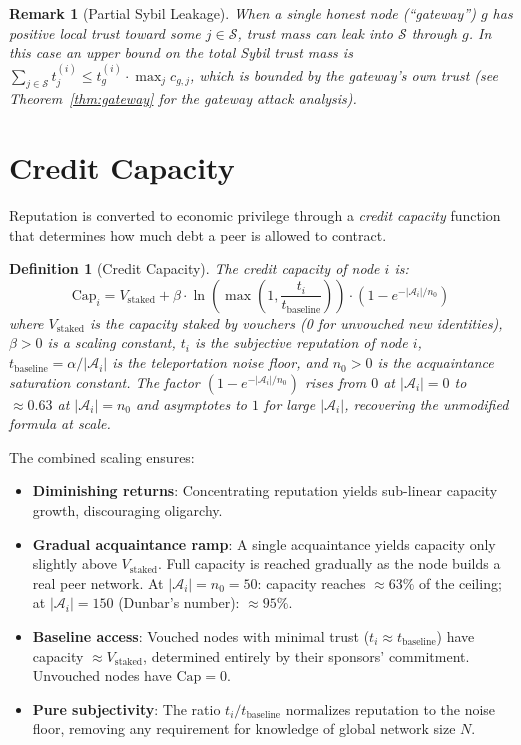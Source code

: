 \documentclass[11pt]{article}
\newtheorem{definition}[theorem]{Definition}
\newtheorem{remark}[theorem]{Remark}
\begin{document}
\begin{remark}[Partial Sybil Leakage]
When a single honest node (``gateway'') $g$ has positive local trust toward some $j \in \mathcal{S}$, trust mass can leak into $\mathcal{S}$ through $g$. In this case an upper bound on the total Sybil trust mass is $\sum_{j \in \mathcal{S}} t^{(i)}_j \leq t^{(i)}_g \cdot \max_j c_{g,j}$, which is bounded by the gateway's own trust (see Theorem~\ref{thm:gateway} for the gateway attack analysis).
\end{remark}

\section{Credit Capacity}
\label{sec:capacity}

Reputation is converted to economic privilege through a \emph{credit capacity} function that determines how much debt a peer is allowed to contract.

\begin{definition}[Credit Capacity]\label{def:capacity}
The credit capacity of node $i$ is:
\begin{equation}\label{eq:capacity}
    \text{Cap}_i = V_{\text{staked}} + \beta \cdot \ln\left(\max\left(1, \frac{t_i}{t_{\text{baseline}}}\right)\right) \cdot \left(1 - e^{-|\mathcal{A}_i| / n_0}\right)
\end{equation}
where $V_{\text{staked}}$ is the capacity staked by vouchers (0 for unvouched new identities), $\beta > 0$ is a scaling constant, $t_i$ is the subjective reputation of node $i$, $t_{\text{baseline}} = \alpha / |\mathcal{A}_i|$ is the \emph{teleportation noise floor}, and $n_0 > 0$ is the \emph{acquaintance saturation constant}. The factor $(1 - e^{-|\mathcal{A}_i|/n_0})$ rises from $0$ at $|\mathcal{A}_i|=0$ to $\approx 0.63$ at $|\mathcal{A}_i|=n_0$ and asymptotes to $1$ for large $|\mathcal{A}_i|$, recovering the unmodified formula at scale.
\end{definition}

The combined scaling ensures:
\begin{itemize}
    \item \textbf{Diminishing returns}: Concentrating reputation yields sub-linear capacity growth, discouraging oligarchy.
    \item \textbf{Gradual acquaintance ramp}: A single acquaintance yields capacity only slightly above $V_{\text{staked}}$. Full capacity is reached gradually as the node builds a real peer network. At $|\mathcal{A}_i| = n_0 = 50$: capacity reaches $\approx 63\%$ of the ceiling; at $|\mathcal{A}_i| = 150$ (Dunbar's number): $\approx 95\%$.
    \item \textbf{Baseline access}: Vouched nodes with minimal trust ($t_i \approx t_{\text{baseline}}$) have capacity $\approx V_{\text{staked}}$, determined entirely by their sponsors' commitment. Unvouched nodes have $\text{Cap} = 0$.
    \item \textbf{Pure subjectivity}: The ratio $t_i / t_{\text{baseline}}$ normalizes reputation to the noise floor, removing any requirement for knowledge of global network size $N$.
\end{itemize}
\end{document}
